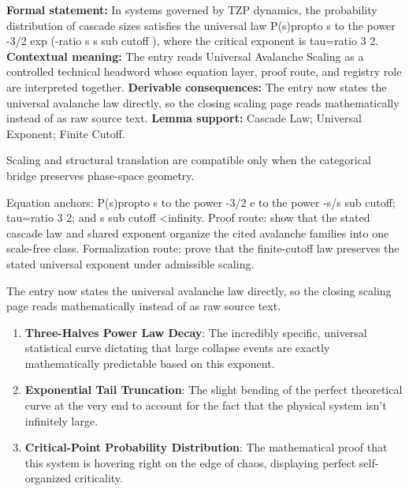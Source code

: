 \begingroup\footnotesize\setlength{\emergencystretch}{3em}\sloppy
\textbf{Formal statement:} In systems governed by TZP dynamics, the probability distribution of cascade sizes satisfies the universal law P(s)propto s to the power -3/2 exp (-ratio s s sub cutoff ), where the critical exponent is tau=ratio 3 2. \textbf{Contextual meaning:} The entry reads Universal Avalanche Scaling as a controlled technical headword whose equation layer, proof route, and registry role are interpreted together. \textbf{Derivable consequences:} The entry now states the universal avalanche law directly, so the closing scaling page reads mathematically instead of as raw source text. \textbf{Lemma support:} Cascade Law; Universal Exponent; Finite Cutoff.\par
\endgroup

Scaling and structural translation are compatible only when the categorical bridge preserves phase-space geometry.

Equation anchors: P(s)propto s to the power -3/2 e to the power -s/s sub cutoff; tau=ratio 3 2; and s sub cutoff <infinity. Proof route: show that the stated cascade law and shared exponent organize the cited avalanche families into one scale-free class. Formalization route: prove that the finite-cutoff law preserves the stated universal exponent under admissible scaling.

The entry now states the universal avalanche law directly, so the closing scaling page reads mathematically instead of as raw source text.
\endgroup

\begin{enumerate}[leftmargin=1.6em,itemsep=6pt,topsep=4pt]
\item \textbf{Three-Halves Power Law Decay}: The incredibly specific, universal statistical curve dictating that large collapse events are exactly mathematically predictable based on this exponent.
\item \textbf{Exponential Tail Truncation}: The slight bending of the perfect theoretical curve at the very end to account for the fact that the physical system isn't infinitely large.
\item \textbf{Critical-Point Probability Distribution}: The mathematical proof that this system is hovering right on the edge of chaos, displaying perfect self-organized criticality.
\end{enumerate}

